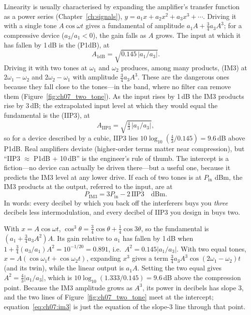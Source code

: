 Linearity is usually characterised by expanding the amplifier's transfer function as a power series
(Chapter~\ref{ch:signals}), $y=a_1x+a_2x^2+a_3x^3+\cdots$. Driving it with a single tone
$A\cos\omega t$ gives a fundamental of amplitude $a_1A+\tfrac34a_3A^3$; for a compressive device
($a_3/a_1<0$), the gain falls as $A$ grows. The input at which it has fallen by 1\,dB is the
 (P1dB), at
\begin{equation}
A_{\text{1dB}}=\sqrt{0.145\,|a_1/a_3|}.
\end{equation}
Driving it with two tones at $\omega_1$ and $\omega_2$ produces, among many products,
 (IM3) at $2\omega_1-\omega_2$ and $2\omega_2-\omega_1$ with amplitude
$\tfrac34a_3A^3$. These are the dangerous ones because they fall close to the tones---in the band, where no
filter can remove them (Figure~\ref{fig:ch07_two_tone}). As the input rises by 1\,dB the IM3 products
rise by 3\,dB; the extrapolated input level at which they would equal the fundamental is the
 (IIP3), at
\begin{equation}
A_{\text{IIP3}}=\sqrt{\tfrac43\,|a_1/a_3|},
\end{equation}
so for a device described by a cubic, IIP3 lies $10\log_{10}(\tfrac43/0.145)=9.6$\,dB above P1dB. Real
amplifiers deviate (higher-order terms matter near compression), but ``IIP3 $\approx$ P1dB + 10\,dB'' is
the engineer's rule of thumb. The intercept is a fiction---no device can actually be driven there---but a
useful one, because it predicts the IM3 level at any lower drive. If each of two tones is at $P_{\text{in}}$
dBm, the IM3 products at the output, referred to the input, are at
\begin{equation}
P_{\text{IM3}}=3P_{\text{in}}-2\,\text{IIP3}\quad\text{dBm}.
\label{eq:ch07:im3}
\end{equation}
In words: every decibel by which you back off the interferers buys you \emph{three} decibels
less intermodulation, and every decibel of IIP3 you design in buys two.

\begin{deeper}
With $x=A\cos\omega t$, $\cos^3\theta=\tfrac34\cos\theta+\tfrac14\cos3\theta$, so the fundamental is
$(a_1+\tfrac34a_3A^2)A$. Its gain relative to $a_1$ has fallen by 1\,dB when
$1+\tfrac34(a_3/a_1)A^2=10^{-1/20}=0.891$, i.e.\ $A^2=0.145|a_1/a_3|$. With two equal tones,
$x=A(\cos\omega_1t+\cos\omega_2t)$, expanding $x^3$ gives a term $\tfrac34a_3A^3\cos(2\omega_1-\omega_2)t$
(and its twin), while the linear output is $a_1A$. Setting the two equal gives $A^2=\tfrac43|a_1/a_3|$,
which is $10\log_{10}(1.333/0.145)=9.6$\,dB above the compression point. Because the IM3 amplitude
grows as $A^3$, its power in decibels has slope 3, and the two lines of Figure~\ref{fig:ch07_two_tone}
meet at the intercept; equation~\eqref{eq:ch07:im3} is just the equation of the slope-3 line through
that point.
\end{deeper}

